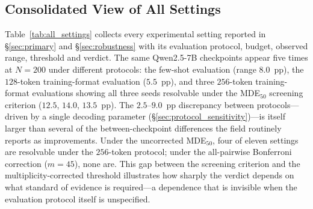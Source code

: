 \documentclass[pdflatex,sn-mathphys-ay,iicol]{sn-jnl}
\theoremstyle{thmstylethree}
\begin{document}
\begin{table}[t]
\subsection{Consolidated View of All Settings}\label{sec:consolidated}

Table~\ref{tab:all_settings} collects every experimental setting reported in \S\ref{sec:primary} and \S\ref{sec:robustness} with its evaluation protocol, budget, observed range, threshold and verdict. The same Qwen2.5-7B checkpoints appear five times at $N=200$ under different protocols: the few-shot evaluation (range $8.0$~pp), the $128$-token training-format evaluation ($5.5$~pp), and three $256$-token training-format evaluations showing all three seeds resolvable under the MDE$_{50}$ screening criterion ($12.5$, $14.0$, $13.5$~pp). The $2.5$--$9.0$~pp discrepancy between protocols---driven by a single decoding parameter (\S\ref{sec:protocol_sensitivity})---is itself larger than several of the between-checkpoint differences the field routinely reports as improvements. Under the uncorrected MDE$_{50}$, four of eleven settings are resolvable under the $256$-token protocol; under the all-pairwise Bonferroni correction ($m=45$), none are. This gap between the screening criterion and the multiplicity-corrected threshold illustrates how sharply the verdict depends on what standard of evidence is required---a dependence that is invisible when the evaluation protocol itself is unspecified.


\end{table}
\end{document}
